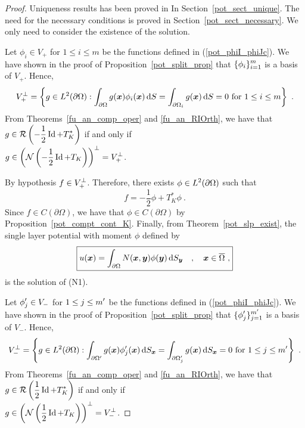 \begin{proof}
Uniqueness results has been proved in In
Section~\ref{pot_sect_unique}.  The need for the necessary conditions
is proved in Section~\ref{pot_sect_necessary}.  We only need to
consider the existence of the solution.

  Let $\phi_i \in V_+$ for $1 \leq i \leq m$ be the
functions defined in (\ref{pot_phiI_phiJc}).  We have shown in the
proof of Proposition~\ref{pot_split_prop} that
$\displaystyle \{\phi_i\}_{i=1}^m$ is a basis of $V_+$.  Hence,
\[
V_+^\perp = \left\{ g \in L^2(\partial \Omega) :
\int_{\partial \Omega} g({\bm{x}}) \phi_i({\bm{x}}) \,\mathrm{d}{S}
= \int_{\partial \Omega_i} g({\bm{x}}) \,\mathrm{d}{S} = 0 \ \text{for}
\ 1 \leq i \leq m \right\} \ .
\]
From Theorems~\ref{fu_an_comp_oper} and \ref{fu_an_RIOrth},
we have that $\displaystyle g \in \mathcal{R} \left(-\frac{1}{2} \operatorname{Id} +T^\ast_K\right)$
if and only if\\
$\displaystyle g \in \left( \mathcal{N} \left( -\frac{1}{2} \operatorname{Id} +
T_K\right)\right)^\perp = V_+^\perp$.

By hypothesis $\displaystyle f \in V_+^\perp$.  Therefore, there exists
$\displaystyle \phi \in L^2(\partial \Omega)$ such that
\[
\boxed{
f = -\frac{1}{2}\phi +T^\ast_K \phi \  .
}
\]
Since $f\in C(\partial \Omega)$, we have that
$\phi \in C(\partial \Omega)$ by Proposition~\ref{pot_compt_cont_K}.
Finally, from Theorem~\ref{pot_slp_exist}, the single layer potential 
with moment $\phi$ defined by
\[
\boxed{
u({\bm{x}}) = \int_{\partial \Omega} N({\bm{x}},{\bm{y}})
\phi({\bm{y}}) \,\mathrm{d}{S}_{{\bm{y}}} \quad , \quad {\bm{x}} \in \overline{\Omega} \ ,
}
\]
is the solution of (N1).

  Let $\displaystyle \phi_j^{\prime} \in V_-$ for
$\displaystyle 1 \leq j \leq m^{\prime}$
be the functions defined in (\ref{pot_phiI_phiJc}).  We have shown in
the proof of Proposition~\ref{pot_split_prop} that
$\displaystyle \{\phi_j^{\prime}\}_{j=1}^{m^{\prime}}$ is a basis of
$V_-$.  Hence,
\[
V_-^\perp = \left\{ g \in L^2(\partial \Omega) :
\int_{\partial \Omega^{\prime}} g(\VEC{x}) \phi_j^{\prime}(\VEC{x}) \dss{S}{x}
= \int_{\partial \Omega_j^{\prime}} g(\VEC{x}) \dss{S}{x} = 0 \ \text{for}
\ 1 \leq j \leq m^{\prime} \right\} \ .
\]
From Theorems~\ref{fu_an_comp_oper} and \ref{fu_an_RIOrth},
we have that $\displaystyle g \in \mathcal{R} \left(\frac{1}{2} \operatorname{Id} +T^\ast_K\right)$
if and only if\\
$\displaystyle g \in \left(\mathcal{N} \left(\frac{1}{2} \operatorname{Id} +T_K\right)\right)^\perp
= V_-^\perp$.


\end{proof}

